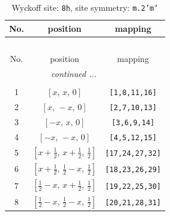 \documentclass[fleqn,8pt]{jsarticle}
\begin{document}
\begin{longtable}{ccc}
\caption{Wyckoff site: {\tt 8h}, site symmetry: {\tt m.2'm'}}
 \\
 \hline \hline
No. & position & mapping \\ \hline \endfirsthead

\multicolumn{2}{l}{\tablename\ \thetable{}} \\
 \hline \hline
No. & position & mapping \\ \hline \endhead

 \hline \hline
\multicolumn{2}{r}{\footnotesize\it continued ...} \\ \endfoot

 \hline \hline
\multicolumn{2}{r}{} \\ \endlastfoot

1 & $\left[ x,\, x,\, 0 \right]$ & {\tt [1,8,11,16]} \\ \hline
2 & $\left[ x,\, - x,\, 0 \right]$ & {\tt [2,7,10,13]} \\ \hline
3 & $\left[ - x,\, x,\, 0 \right]$ & {\tt [3,6,9,14]} \\ \hline
4 & $\left[ - x,\, - x,\, 0 \right]$ & {\tt [4,5,12,15]} \\ \hline
5 & $\left[ x + \frac{1}{2},\, x + \frac{1}{2},\, \frac{1}{2} \right]$ & {\tt [17,24,27,32]} \\ \hline
6 & $\left[ x + \frac{1}{2},\, \frac{1}{2} - x,\, \frac{1}{2} \right]$ & {\tt [18,23,26,29]} \\ \hline
7 & $\left[ \frac{1}{2} - x,\, x + \frac{1}{2},\, \frac{1}{2} \right]$ & {\tt [19,22,25,30]} \\ \hline
8 & $\left[ \frac{1}{2} - x,\, \frac{1}{2} - x,\, \frac{1}{2} \right]$ & {\tt [20,21,28,31]} \\
\end{longtable}
\renewcommand{\arraystretch}{1.2}
\end{document}
